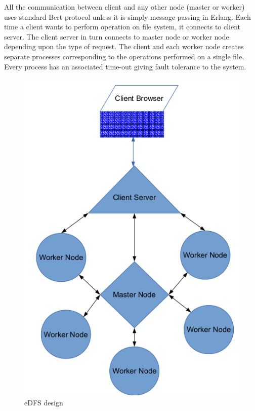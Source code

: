 \documentclass[a4paper,12pt]{article}
\begin{document}
All the communication between client and any other node (master or worker) uses standard Bert protocol \cite{bert} unless it is simply message passing in Erlang. Each time a client wants to perform operation on file system, it connects to client server. The client server in turn connects to master node or worker node depending upon the type of request. The client and each worker node creates separate processes corresponding to the operations performed on a single file. Every process has an associated time-out giving fault tolerance to the system.

\begin{figure}[h]
  \begin{center}
    \includegraphics[scale = 0.5]{images/design}
  \end{center}
  \caption{eDFS design}
  \label{edfs_design}
\end{figure}
\end{document}
